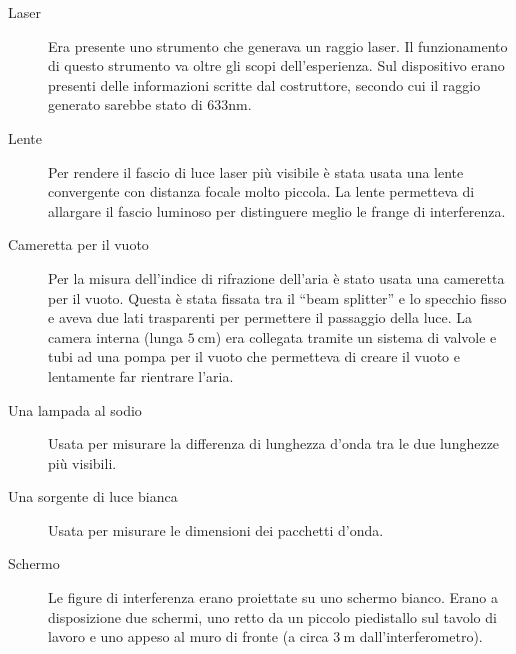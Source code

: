 \documentclass[a4paper,11pt]{article}
\newcommand{\virgolette}[1]{``#1''}
\begin{document}
\begin{description}
	
	\item[Laser] Era presente uno strumento che generava un raggio laser. Il funzionamento di questo strumento va oltre gli scopi dell'esperienza. Sul dispositivo erano presenti delle informazioni scritte dal costruttore, secondo cui il raggio generato sarebbe stato di $ 633\si{\nano\meter} $.
	\item[Lente] Per rendere il fascio di luce laser più visibile è stata usata una lente convergente con distanza focale molto piccola. La lente permetteva di allargare il fascio luminoso per distinguere meglio le frange di interferenza.
	\item[Cameretta per il vuoto] Per la misura dell'indice di rifrazione dell'aria è stato usata una cameretta per il vuoto. Questa è stata fissata tra il \virgolette{beam splitter} e lo specchio fisso e aveva due lati trasparenti per permettere il passaggio della luce. La camera interna (lunga $ \SI{5}{\centi\meter}$) era collegata tramite un sistema di valvole e tubi ad una pompa per il vuoto che permetteva di creare il vuoto e lentamente far rientrare l'aria.
	\item[Una lampada al sodio] Usata per misurare la differenza di lunghezza d'onda tra le due lunghezze più visibili.
	\item[Una sorgente di luce bianca] Usata per misurare le dimensioni dei pacchetti d'onda.
	\item[Schermo] Le figure di interferenza erano proiettate su uno schermo bianco. Erano a disposizione due schermi, uno retto da un piccolo piedistallo sul tavolo di lavoro e uno appeso al muro di fronte (a circa $ \SI{3}{\meter} $ dall'interferometro).
\end{description}
\end{document}
